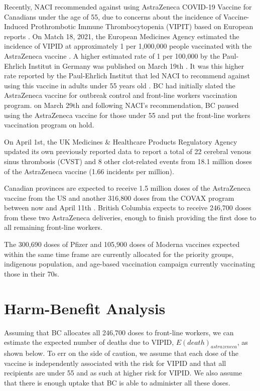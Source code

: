 \documentclass[]{interact}
\theoremstyle{plain}%
\theoremstyle{definition}
\theoremstyle{remark}
\begin{document}
Recently, NACI recommended against using AstraZeneca COVID-19 Vaccine
for Canadians under the age of 55, due to concerns about the incidence
of Vaccine-Induced Prothrombotic Immune Thrombocytopenia (VIPIT) based
on European reports \citep{naci_naci_2021}. On Match 18, 2021, the
European Medicines Agency estimated the incidence of VIPID at
approximately 1 per 1,000,000 people vaccinated with the AstraZeneca
vaccine \citep{ema_covid-19_2021}. A higher estimated rate of 1 per
100,000 by the Paul-Ehrlich Institut in Germany was published on March
19th \citep{pei_covid-19_2021}. It was this higher rate reported by the
Paul-Ehrlich Institut that led NACI to recommend against using this
vaccine in adults under 55 years old \citep{naci_naci_2021}. BC had
initially slated the AstraZeneca vaccine for outbreak control and
front-line workers vaccination program. on March 29th and following
NACI's recommendation, BC paused using the AstraZeneca vaccine for those
under 55 and put the front-line workers vaccination program on hold.

On April 1st, the UK Medicines \& Healthcare Products Regulatory Agency
updated its own previously reported data to report a total of 22
cerebral venous sinus thrombosis (CVST) and 8 other clot-related events
from 18.1 million doses of the AstraZeneca vaccine (1.66 incidents per
million).

Canadian provinces are expected to receive 1.5 million doses of the
AstraZeneca vaccine from the US and another 316,800 doses from the COVAX
program between now and April 11th
\citep{government_of_canada_vaccines_2021}. British Columbia expects to
receive 246,700 doses from these two AstraZeneca deliveries, enough to
finish providing the first dose to all remaining front-line workers.

The 300,690 doses of Pfizer and 105,900 doses of Moderna vaccines
expected within the same time frame are currently allocated for the
priority groups, indigenous population, and age-based vaccination
campaign currently vaccinating those in their 70s.

\hypertarget{harm-benefit-analysis}{%
\section{Harm-Benefit Analysis}\label{harm-benefit-analysis}}

Assuming that BC allocates all 246,700 doses to front-line workers, we
can estimate the expected number of deaths due to VIPID,
\(E(death)_{astrazeneca}\), as shown below. To err on the side of
caution, we assume that each dose of the vaccine is independently
associated with the risk for VIPID and that all recipients are under 55
and as such at higher risk for VIPID. We also assume that there is
enough uptake that BC is able to administer all these doses.
\end{document}
